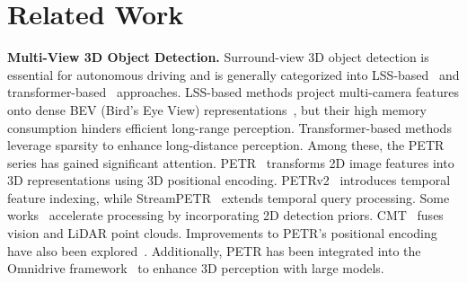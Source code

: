\vspace{-2mm}
\section{Related Work}
\label{sec:related}

\textbf{Multi-View 3D Object Detection.}
Surround-view 3D object detection is essential for autonomous driving and is generally categorized into LSS-based~\cite{bevdet,bevdepth,bevdet4d} and transformer-based~\cite{liu2022petr,shu20233DPPE} approaches. LSS-based methods project multi-camera features onto dense BEV (Bird's Eye View) representations~\cite{lss}, but their high memory consumption hinders efficient long-range perception. Transformer-based methods leverage sparsity to enhance long-distance perception. Among these, the PETR series has gained significant attention. PETR~\cite{liu2022petr} transforms 2D image features into 3D representations using 3D positional encoding. PETRv2~\cite{liu2022petrv2} introduces temporal feature indexing, while StreamPETR~\cite{streampetr} extends temporal query processing. Some works~\cite{wang2022focal, wang2023object, chu2024rayformer} accelerate processing by incorporating 2D detection priors. CMT~\cite{cmt} fuses vision and LiDAR point clouds. Improvements to PETR's positional encoding have also been explored~\cite{shu20233DPPE, hou2024open}. Additionally, PETR has been integrated into the Omnidrive framework~\cite{wang2024omnidrive} to enhance 3D perception with large models.

